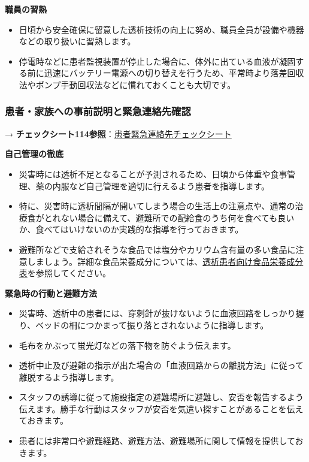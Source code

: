 \documentclass[
  japanese,
  letterpaper,
  DIV=11,
  numbers=noendperiod]{scrartcl}
\providecommand{\tightlist}{%
  \setlength{\itemsep}{0pt}\setlength{\parskip}{0pt}}
\begin{document}
\textbf{職員の習熟}

\begin{itemize}
\tightlist
\item
  日頃から安全確保に留意した透析技術の向上に努め、職員全員が設備や機器などの取り扱いに習熟します。
\item
  停電時などに患者監視装置が停止した場合に、体外に出ている血液が凝固する前に迅速にバッテリー電源への切り替えを行うため、平常時より落差回収法やポンプ手動回収法などに慣れておくことも大切です。
\end{itemize}

\subsubsection{患者・家族への事前説明と緊急連絡先確認}\label{ux60a3ux8005ux5bb6ux65cfux3078ux306eux4e8bux524dux8aacux660eux3068ux7dcaux6025ux9023ux7d61ux5148ux78baux8a8d}

→
\textbf{チェックシート114参照}：\href{1330_患者緊急連絡先チェックシート.qmd}{患者緊急連絡先チェックシート}

\textbf{自己管理の徹底}

\begin{itemize}
\tightlist
\item
  災害時には透析不足となることが予測されるため、日頃から体重や食事管理、薬の内服など自己管理を適切に行えるよう患者を指導します。
\item
  特に、災害時に透析間隔が開いてしまう場合の生活上の注意点や、通常の治療食がとれない場合に備えて、避難所での配給食のうち何を食べても良いか、食べてはいけないのか実践的な指導を行っておきます。
\item
  避難所などで支給されそうな食品では塩分やカリウム含有量の多い食品に注意しましょう。詳細な食品栄養成分については、\href{9930_透析患者向け食品栄養成分表.qmd}{透析患者向け食品栄養成分表}を参照してください。
\end{itemize}

\textbf{緊急時の行動と避難方法}

\begin{itemize}
\tightlist
\item
  災害時、透析中の患者には、穿刺針が抜けないように血液回路をしっかり握り、ベッドの柵につかまって振り落とされないように指導します。
\item
  毛布をかぶって蛍光灯などの落下物を防ぐよう伝えます。
\item
  透析中止及び避難の指示が出た場合の「血液回路からの離脱方法」に従って離脱するよう指導します。
\item
  スタッフの誘導に従って施設指定の避難場所に避難し、安否を報告するよう伝えます。勝手な行動はスタッフが安否を気遣い探すことがあることを伝えておきます。
\item
  患者には非常口や避難経路、避難方法、避難場所に関して情報を提供しておきます。
\end{itemize}
\end{document}
